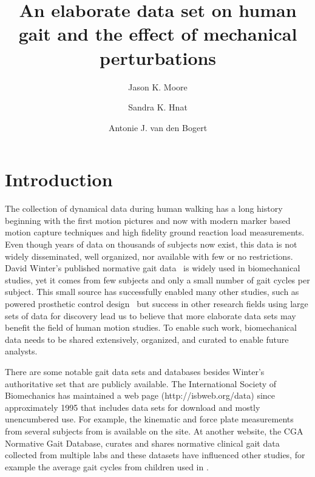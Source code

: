 \documentclass[fleqn,12pt]{wlpeerj}
\title{An elaborate data set on human gait and the effect of mechanical
  perturbations}
\author[1]{Jason K. Moore}
\author[1]{Sandra K. Hnat}
\author[1]{Antonie J. van den Bogert}
\affil[1]{Mechanical Engineering, Cleveland State University, Cleveland, Ohio,
  USA, 44115. j.k.moore19@csuohio.edu, s.hnat@vikes.csuohio.edu,
  a.vandenbogert@csuohio.edu}
\begin{document}
\flushbottom
\maketitle
\thispagestyle{empty}

\section*{Introduction}
%
The collection of dynamical data during human walking has a long history
beginning with the first motion pictures and now with modern marker based
motion capture techniques and high fidelity ground reaction load measurements.
Even though years of data on thousands of subjects now exist, this data is not
widely disseminated, well organized, nor available with few or no restrictions.
David Winter's published normative gait data~\citep{Winter1990} is widely used
in biomechanical studies, yet it comes from few subjects and only a small
number of gait cycles per subject. This small source has successfully enabled
many other studies, such as powered prosthetic control design~\citep{Sup2008}
but success in other research fields using large sets of data for discovery
lead us to believe that more elaborate data sets may benefit the field of
human motion studies. To enable such work, biomechanical data needs to be
shared extensively, organized, and curated to enable future analysts.

There are some notable gait data sets and databases besides Winter's
authoritative set that are publicly available. The International Society of
Biomechanics has maintained a web page (http://isbweb.org/data) since
approximately 1995 that includes data sets for download and mostly unencumbered
use. For example, the kinematic and force plate measurements from several
subjects from \cite{Vaughan1992} is available on the site. At another website,
the CGA Normative Gait Database, \cite{Kirtley2014} curates and shares
normative clinical gait data collected from multiple labs and these datasets
have influenced other studies, for example the average gait cycles from
children used in \cite{Bogert2003}.
\end{document}
